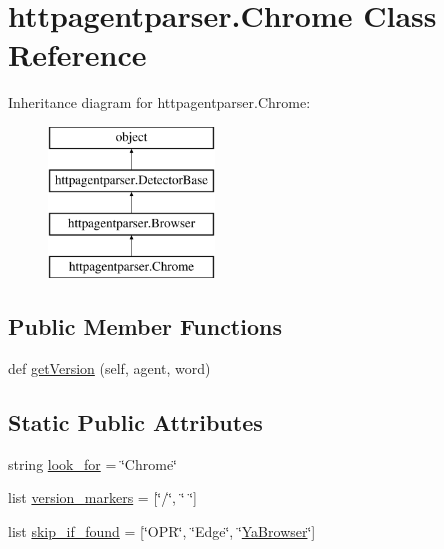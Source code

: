 \hypertarget{classhttpagentparser_1_1_chrome}{}\section{httpagentparser.\+Chrome Class Reference}
\label{classhttpagentparser_1_1_chrome}
Inheritance diagram for httpagentparser.\+Chrome\+:\begin{figure}[H]
\begin{center}
\leavevmode
\includegraphics[height=4.000000cm]{classhttpagentparser_1_1_chrome}
\end{center}
\end{figure}
\subsection*{Public Member Functions}
\begin{DoxyCompactItemize}
\item 
def \hyperlink{classhttpagentparser_1_1_chrome_a5a9aba078184a6657a8d60e475e28d2b}{get\+Version} (self, agent, word)
\end{DoxyCompactItemize}
\subsection*{Static Public Attributes}
\begin{DoxyCompactItemize}
\item 
string \hyperlink{classhttpagentparser_1_1_chrome_a07cabb02480882dac8e05dcefdbfbd55}{look\+\_\+for} = \char`\"{}Chrome\char`\"{}
\item 
list \hyperlink{classhttpagentparser_1_1_chrome_a92610d7101505c3662e84d962e4d5e9e}{version\+\_\+markers} = \mbox{[}\char`\"{}/\char`\"{}, \char`\"{} \char`\"{}\mbox{]}
\item 
list \hyperlink{classhttpagentparser_1_1_chrome_a6c91c362fbe10966edbc1da1820a3ddf}{skip\+\_\+if\+\_\+found} = \mbox{[}\char`\"{}O\+PR\char`\"{}, \char`\"{}Edge\char`\"{}, \char`\"{}\hyperlink{classhttpagentparser_1_1_ya_browser}{Ya\+Browser}\char`\"{}\mbox{]}
\end{DoxyCompactItemize}
